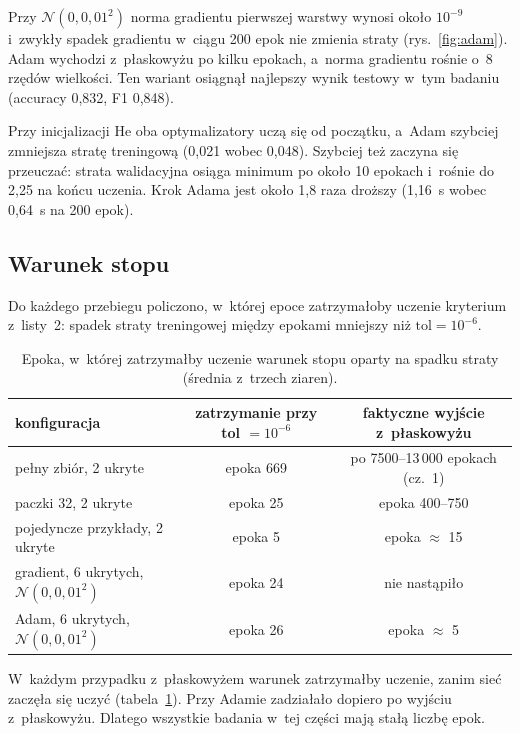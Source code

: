 \documentclass[11pt,a4paper]{article}
\begin{document}
Przy $\mathcal{N}(0, 0{,}01^2)$ norma gradientu pierwszej warstwy wynosi około $10^{-9}$
i~zwykły spadek gradientu w~ciągu 200 epok nie zmienia straty (rys.~\ref{fig:adam}). Adam wychodzi
z~płaskowyżu po kilku epokach, a~norma gradientu rośnie o~8 rzędów wielkości. Ten wariant osiągnął najlepszy
wynik testowy w~tym badaniu (accuracy 0,832, F1 0,848).

Przy inicjalizacji He oba optymalizatory uczą się od początku, a~Adam szybciej zmniejsza stratę
treningową (0,021 wobec 0,048). Szybciej też zaczyna się przeuczać: strata walidacyjna osiąga
minimum po około 10 epokach i~rośnie do 2,25 na końcu uczenia. Krok Adama jest około 1,8 raza droższy (1,16~s wobec 0,64~s na 200 epok).

\subsection{Warunek stopu}
Do każdego przebiegu policzono, w~której epoce zatrzymałoby uczenie kryterium z~listy~2:
spadek straty treningowej między epokami mniejszy niż $\mathrm{tol} = 10^{-6}$.

\begin{table}[H]
\centering
\small
\begin{tabular}{lcc}
\toprule
konfiguracja & zatrzymanie przy tol $= 10^{-6}$ & faktyczne wyjście z~płaskowyżu \\
\midrule
pełny zbiór, 2 ukryte          & epoka 669 & po 7500--13\,000 epokach (cz.~1) \\
paczki 32, 2 ukryte            & epoka 25  & epoka 400--750 \\
pojedyncze przykłady, 2 ukryte & epoka 5   & epoka $\approx$ 15 \\
gradient, 6 ukrytych, $\mathcal{N}(0, 0{,}01^2)$ & epoka 24 & nie nastąpiło \\
Adam, 6 ukrytych, $\mathcal{N}(0, 0{,}01^2)$     & epoka 26 & epoka $\approx$ 5 \\
\bottomrule
\end{tabular}
\caption{Epoka, w~której zatrzymałby uczenie warunek stopu oparty na spadku straty (średnia z~trzech ziaren).}
\label{tab:tol}
\end{table}

W~każdym przypadku z~płaskowyżem warunek zatrzymałby uczenie, zanim sieć zaczęła się uczyć
(tabela~\ref{tab:tol}). Przy Adamie zadziałało dopiero po wyjściu z~płaskowyżu. Dlatego
wszystkie badania w~tej części mają stałą liczbę epok.
\end{document}
